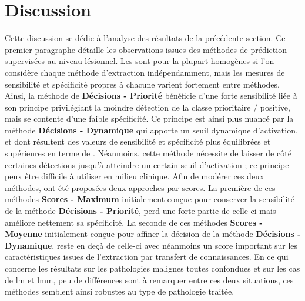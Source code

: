 \section{Discussion}
Cette discussion se dédie à l'analyse des résultats de la précédente section. Ce premier paragraphe détaille les observations issues des méthodes de prédiction supervisées au niveau lésionnel. Les \fscore{} sont pour la plupart homogènes si l'on considère chaque méthode d'extraction indépendamment, mais les mesures de sensibilité et spécificité propres à chacune varient fortement entre méthodes. Ainsi, la méthode de \textbf{Décisions - Priorité} bénéficie d'une forte sensibilité liée à son principe privilégiant la moindre détection de la classe prioritaire / positive, mais se contente d'une faible spécificité. Ce principe est ainsi plus nuancé par la méthode \textbf{Décisions - Dynamique} qui apporte un seuil dynamique d'activation, et dont résultent des valeurs de sensibilité et spécificité plus équilibrées et supérieures en terme de \fscore{}. Néanmoins, cette méthode nécessite de laisser de côté certaines détections jusqu'à atteindre un certain seuil d'activation ; ce principe peux être difficile à utiliser en milieu clinique. Afin de modérer ces deux méthodes, ont été proposées deux approches par scores. La première de ces méthodes \textbf{Scores - Maximum} initialement conçue pour conserver la sensibilité de la méthode \textbf{Décisions - Priorité}, perd une forte partie de celle-ci mais améliore nettement sa spécificité. La seconde de ces méthodes \textbf{Scores - Moyenne} initialement conçue pour affiner la décision de la méthode \textbf{Décisions - Dynamique}, reste en deçà de celle-ci avec néanmoins un score important sur les caractéristiques issues de l'extraction par transfert de connaissances. En ce qui concerne les résultats sur les pathologies malignes toutes confondues et sur les cas de \gls{lm} et \gls{lmm}, peu de différences sont à remarquer entre ces deux situations, ces méthodes semblent ainsi robustes au type de pathologie traitée.\par


